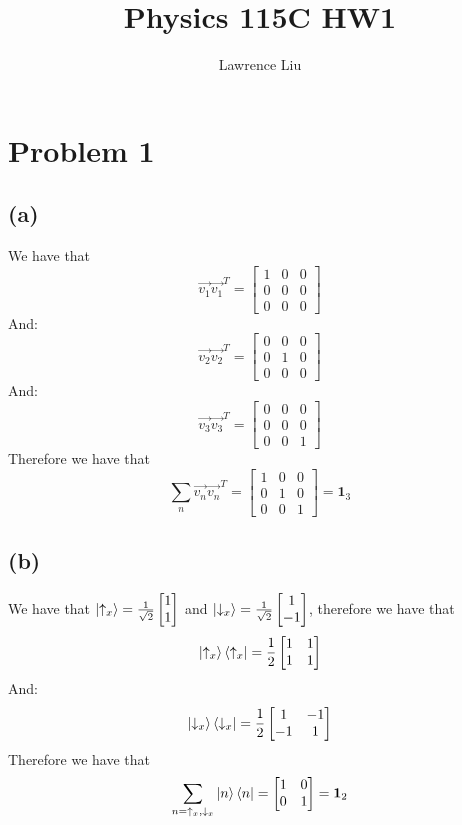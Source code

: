 \documentclass[11pt]{article}
\author{Lawrence Liu}
\title{Physics 115C HW1}
\begin{document}
\maketitle
\section{Problem 1}
\subsection*{(a)}
We have that 
$$\vec{v_1}\vec{v_1}^T=
\begin{bmatrix}
    1 & 0 & 0 \\
    0 & 0 & 0 \\
    0 & 0 & 0
\end{bmatrix}$$
And:
$$\vec{v_2}\vec{v_2}^T=
\begin{bmatrix}
    0 & 0 & 0 \\
    0 & 1 & 0 \\
    0 & 0 & 0
\end{bmatrix}$$
And:
$$\vec{v_3}\vec{v_3}^T=
\begin{bmatrix}
    0 & 0 & 0 \\
    0 & 0 & 0 \\
    0 & 0 & 1
\end{bmatrix}$$
Therefore we have that 
$$\sum_{n} \vec{v_n}\vec{v_n}^T= \begin{bmatrix}
    1 & 0 & 0 \\
    0 & 1 & 0 \\
    0 & 0 & 1
\end{bmatrix}=\mathbf{1}_3$$
\subsection*{(b)}
We have that $\ket{\uparrow_x}=\frac{1}{\sqrt{2}}
\begin{bmatrix}
    1 \\
    1
\end{bmatrix}$ and $\ket{\downarrow_x}=\frac{1}{\sqrt{2}}
\begin{bmatrix}
    1 \\
    -1
\end{bmatrix}$, therefore we have that 
$$\ket{\uparrow_x}\bra{\uparrow_x}=\frac{1}{2}
\begin{bmatrix}
    1 & 1 \\
    1 & 1
\end{bmatrix}$$
And:
$$\ket{\downarrow_x}\bra{\downarrow_x}=\frac{1}{2}
\begin{bmatrix}
    1 & -1 \\
    -1 & 1
\end{bmatrix}$$
Therefore we have that
$$\sum_{n=\uparrow_x,\downarrow_x} \ket{n}\bra{n}=
\begin{bmatrix}
    1 & 0 \\
    0 & 1
\end{bmatrix}=\mathbf{1}_2$$
\end{document}
